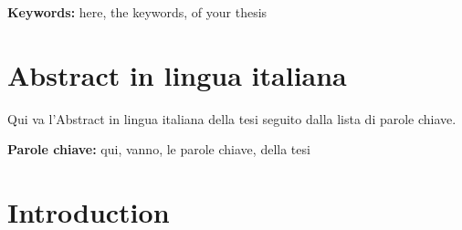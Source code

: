 \documentclass{Configuration_Files/PoliMi3i_thesis}
\begin{document}
\textbf{Keywords:} here, the keywords, of your thesis %

\chapter*{Abstract in lingua italiana}
Qui va l'Abstract in lingua italiana della tesi seguito dalla lista di parole chiave.

\textbf{Parole chiave:} qui, vanno, le parole chiave, della tesi %


\thispagestyle{empty}
\tableofcontents %
\thispagestyle{empty}
\cleardoublepage

%
%
%    
%

\mainmatter %

\chapter{Introduction}
\label{ch:introduction}
\end{document}
